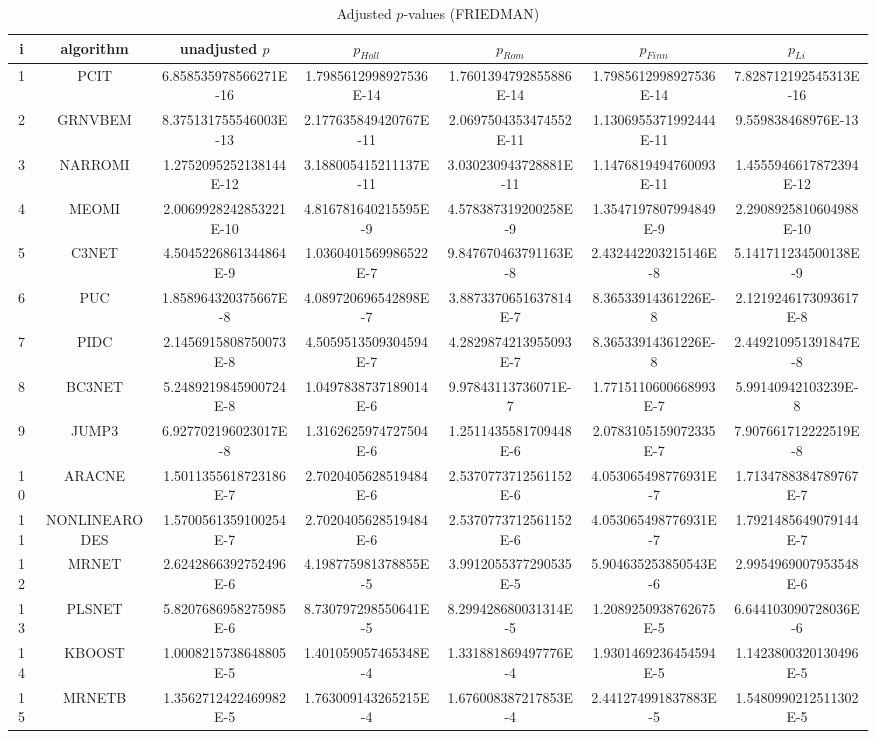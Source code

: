 \documentclass[a4paper,10pt]{article}
\begin{document}
\begin{landscape}
\begin{table}[!htp]
\centering\scriptsize
\caption{Adjusted $p$-values (FRIEDMAN)}
\begin{tabular}{ccccccc}
i&algorithm&unadjusted $p$&$p_{Holl}$&$p_{Rom}$&$p_{Finn}$&$p_{Li}$\\
\hline
1&PCIT&6.858535978566271E-16&1.7985612998927536E-14&1.7601394792855886E-14&1.7985612998927536E-14&7.828712192545313E-16\\
2&GRNVBEM&8.375131755546003E-13&2.177635849420767E-11&2.0697504353474552E-11&1.1306955371992444E-11&9.559838468976E-13\\
3&NARROMI&1.2752095252138144E-12&3.188005415211137E-11&3.030230943728881E-11&1.1476819494760093E-11&1.4555946617872394E-12\\
4&MEOMI&2.0069928242853221E-10&4.816781640215595E-9&4.578387319200258E-9&1.3547197807994849E-9&2.2908925810604988E-10\\
5&C3NET&4.5045226861344864E-9&1.0360401569986522E-7&9.847670463791163E-8&2.432442203215146E-8&5.141711234500138E-9\\
6&PUC&1.858964320375667E-8&4.089720696542898E-7&3.8873370651637814E-7&8.36533914361226E-8&2.1219246173093617E-8\\
7&PIDC&2.1456915808750073E-8&4.5059513509304594E-7&4.2829874213955093E-7&8.36533914361226E-8&2.449210951391847E-8\\
8&BC3NET&5.2489219845900724E-8&1.0497838737189014E-6&9.97843113736071E-7&1.7715110600668993E-7&5.99140942103239E-8\\
9&JUMP3&6.927702196023017E-8&1.3162625974727504E-6&1.2511435581709448E-6&2.0783105159072335E-7&7.907661712222519E-8\\
10&ARACNE&1.5011355618723186E-7&2.7020405628519484E-6&2.5370773712561152E-6&4.053065498776931E-7&1.7134788384789767E-7\\
11&NONLINEARODES&1.5700561359100254E-7&2.7020405628519484E-6&2.5370773712561152E-6&4.053065498776931E-7&1.7921485649079144E-7\\
12&MRNET&2.6242866392752496E-6&4.198775981378855E-5&3.9912055377290535E-5&5.904635253850543E-6&2.9954969007953548E-6\\
13&PLSNET&5.8207686958275985E-6&8.730797298550641E-5&8.299428680031314E-5&1.2089250938762675E-5&6.644103090728036E-6\\
14&KBOOST&1.0008215738648805E-5&1.401059057465348E-4&1.331881869497776E-4&1.9301469236454594E-5&1.1423800320130496E-5\\
15&MRNETB&1.3562712422469982E-5&1.763009143265215E-4&1.676008387217853E-4&2.441274991837883E-5&1.5480990212511302E-5\\

\end{tabular}
\end{table}
\end{landscape}
\end{document}

